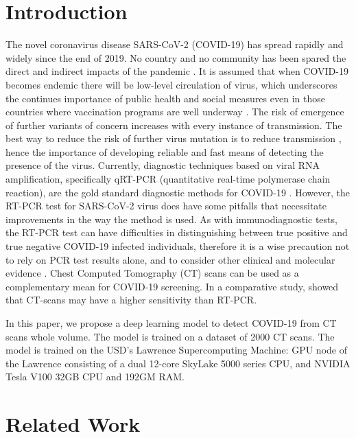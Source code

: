 \documentclass[12pt, letterpaper]{article}
\begin{document}
\section{Introduction}
The novel coronavirus disease SARS-CoV-2 (COVID-19) has spread rapidly and widely since the end of 2019. No country and no community has been spared the direct and indirect impacts of the pandemic \cite{WHO_2021}. It is assumed that when COVID-19 becomes endemic there will be low-level circulation of virus, which underscores the continues importance of public health and social measures even in those countries where vaccination programs are well underway \cite{WHO_2021}\cite{WHO_2022}. The risk of emergence of further variants of concern increases with every instance of transmission. The best way to reduce the risk of further virus mutation is to reduce transmission \cite{WHO_2021}, hence the importance of developing reliable and fast means of detecting the presence of the virus. Currently, diagnostic techniques based on viral RNA amplification, specifically qRT-PCR (quantitative real-time polymerase chain reaction), are the gold standard diagnostic methods for COVID-19 \cite{Teymouri_2021}. However, the RT-PCR test for SARS-CoV-2 virus does have some pitfalls that necessitate improvements in the way the method is used. As with immunodiagnostic tests, the RT-PCR test can have difficulties in distinguishing between true positive and true negative COVID-19 infected individuals, therefore it is a wise precaution not to rely on PCR test results alone, and to consider other clinical and molecular evidence \cite{Teymouri_2021}. 
Chest Computed Tomography (CT) scans can be used as a complementary mean for COVID-19 screening. In a comparative study, \cite{Fang_2020} showed that CT-scans may have a higher sensitivity than RT-PCR. 


In this paper, we propose a deep learning model to detect COVID-19 from CT scans whole volume. The model is trained on a dataset of 2000 CT scans. The model is trained on the USD’s Lawrence Supercomputing Machine: GPU node of the Lawrence consisting of a dual 12-core SkyLake 5000 series CPU, and NVIDIA Tesla V100 32GB CPU and 192GM RAM.


\newpage
\section{Related Work}
\end{document}

